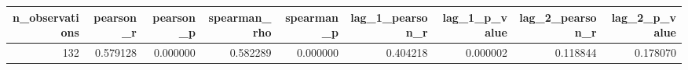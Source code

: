 \begin{tabular}{rrrrrrrrr}
\toprule
n\_observations & pearson\_r & pearson\_p & spearman\_rho & spearman\_p & lag\_1\_pearson\_r & lag\_1\_p\_value & lag\_2\_pearson\_r & lag\_2\_p\_value \\
\midrule
132 & 0.579128 & 0.000000 & 0.582289 & 0.000000 & 0.404218 & 0.000002 & 0.118844 & 0.178070 \\
\bottomrule
\end{tabular}
